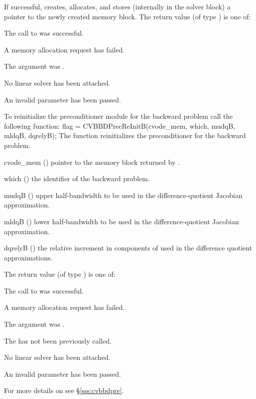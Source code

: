 {
  If successful,  creates, allocates, and stores (internally
  in the {\cvodes} solver block) a pointer to the newly created 
  {\cvbbdpre} memory block.
  The return value  (of type ) is one of:
  \begin{args}
  \item[\Id{CVSPILS\_SUCCESS}]
    The call to  was successful.
  \item[\Id{CVSPILS\_MEM\_FAIL}]
    A memory allocation request has failed.
  \item[\Id{CVSPILS\_MEM\_NULL}]
    The  argument was .
  \item[\Id{CVSPILS\_LMEM\_NULL}]
    No linear solver has been attached.
  \item[\Id{CVSPILS\_ILL\_INPUT}]
    An invalid parameter has been passed.
  \end{args}
}
{}
To reinitialize the {\cvbbdpre} preconditioner module for the backward problem
call the following function:
{
  flag = CVBBDPrecReInitB(cvode\_mem, which, mudqB, mldqB, dqrelyB);
}
{
  The function  reinitializes the {\cvbbdpre} preconditioner
  for the backward problem.
}
{
  \begin{args}
  \item[cvode\_mem] ()
    pointer to the {\cvodes} memory block returned by .
  \item[which] ()
    the identifier of the backward problem.
  \item[mudqB] ()
    upper half-bandwidth to be used in the difference-quotient Jacobian approximation.
  \item[mldqB] ()
    lower half-bandwidth to be used in the difference-quotient Jacobian approximation.
  \item[dqrelyB] ()
    the relative increment in components of  used in the difference quotient
    approximations.
  \end{args}
}
{
  The return value  (of type ) is one of:
  \begin{args}
  \item[\Id{CVSPILS\_SUCCESS}]
    The call to  was successful.
  \item[\Id{CVSPILS\_MEM\_FAIL}]
    A memory allocation request has failed.
  \item[\Id{CVSPILS\_MEM\_NULL}]
    The  argument was .
  \item[\Id{CVSPILS\_PMEM\_NULL}]
    The  has not been previously called.
  \item[\Id{CVSPILS\_LMEM\_NULL}]
    No linear solver has been attached.
  \item[\Id{CVSPILS\_ILL\_INPUT}]
    An invalid parameter has been passed.
  \end{args}
}
{}
For more details on {\cvbbdpre} see \S\ref{sss:cvbbdpre}.

